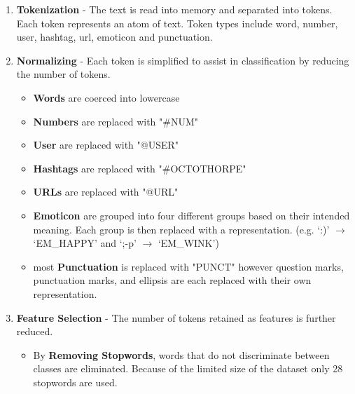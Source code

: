 \documentclass[final,3p,12pt]{elsarticle}
\begin{document}
\begin{enumerate}

    \item \textbf{Tokenization} - The text is read into memory and separated into
        tokens. Each token represents an atom of text. Token types include
        word, number, user, hashtag, url, emoticon and punctuation.

    \item \textbf{Normalizing} - Each token is simplified to assist in
        classification by reducing the number of tokens.

        \begin{itemize}

            \item \textbf{Words} are coerced into lowercase

            \item \textbf{Numbers} are replaced with "\#NUM"

            \item \textbf{User} are replaced with "@USER"

            \item \textbf{Hashtags} are replaced with "\#OCTOTHORPE"

            \item \textbf{URLs} are replaced with "@URL"

            \item \textbf{Emoticon} are grouped into four different groups
                based on their intended meaning. Each group is then replaced
                with a representation. (e.g. `:)' $\rightarrow$ `EM\_HAPPY' and
                `;-p' $\rightarrow$ `EM\_WINK')

            \item most \textbf{Punctuation} is replaced with "PUNCT" however
                question marks, punctuation marks, and ellipsis are each
                replaced with their own representation.

        \end{itemize}

    \item \textbf{Feature Selection} - The number of tokens retained as
        features is further reduced.
        \begin{itemize}

            \item By \textbf{Removing Stopwords}, words that do not
                discriminate between classes are eliminated. Because of the
                limited size of the dataset only 28 stopwords are used.


\end{itemize}
\end{enumerate}
\end{document}
